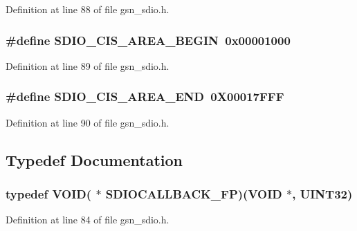 Definition at line 88 of file gsn\_\-sdio.h.

\hypertarget{a00584_a3b22f24b4f15dd534965c34cb799bfa7}{
\subsubsection[{SDIO\_\-CIS\_\-AREA\_\-BEGIN}]{\setlength{\rightskip}{0pt plus 5cm}\#define SDIO\_\-CIS\_\-AREA\_\-BEGIN~0x00001000}}
\label{a00584_a3b22f24b4f15dd534965c34cb799bfa7}


Definition at line 89 of file gsn\_\-sdio.h.

\hypertarget{a00584_a71aae0580975b9c963aecd8228dffd90}{
\subsubsection[{SDIO\_\-CIS\_\-AREA\_\-END}]{\setlength{\rightskip}{0pt plus 5cm}\#define SDIO\_\-CIS\_\-AREA\_\-END~0X00017FFF}}
\label{a00584_a71aae0580975b9c963aecd8228dffd90}


Definition at line 90 of file gsn\_\-sdio.h.



\subsection{Typedef Documentation}
\hypertarget{a00584_ac80005f1e9ff1e1e884583938336474b}{
\subsubsection[{SDIOCALLBACK\_\-FP}]{\setlength{\rightskip}{0pt plus 5cm}typedef VOID( $\ast$ {\bf SDIOCALLBACK\_\-FP})(VOID $\ast$, {\bf UINT32})}}
\label{a00584_ac80005f1e9ff1e1e884583938336474b}


Definition at line 84 of file gsn\_\-sdio.h.



